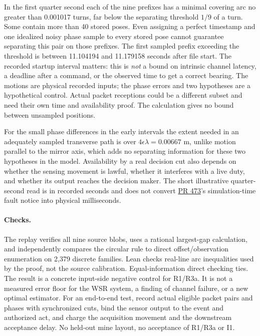 \documentclass[11pt]{article}
\begin{document}
In the first quarter second each of the nine prefixes has a minimal covering arc no greater than 0.001017 turns, far below the separating threshold $1/9$ of a turn. Some contain more than 40 stored poses. Even assigning a perfect timestamp and one idealized noisy phase sample to every stored pose cannot guarantee separating this pair on those prefixes. The first sampled prefix exceeding the threshold is between 11.104194 and 11.179158 seconds after file start. The recorded startup interval matters: this is \emph{not} a bound on intrinsic channel latency, a deadline after a command, or the observed time to get a correct bearing. The motions are physical recorded inputs; the phase errors and two hypotheses are a hypothetical control. Actual packet receptions could be a different subset and need their own time and availability proof. The calculation gives no bound between unsampled positions.

For the small phase differences in the early intervals the extent needed in an adequately sampled transverse path is over $4\epsilon\lambda=0.00667$ m, unlike motion parallel to the mirror axis, which adds no separating information for these two hypotheses in the model. Availability by a real decision cut also depends on whether the sensing movement is lawful, whether it interferes with a live duty, and whether its output reaches the decision maker. The short illustrative quarter-second read is in recorded seconds and does not convert \href{https://github.com/eternal-november/eos-research-programmes/pull/473}{PR 473}'s simulation-time fault notice into physical milliseconds.

\paragraph{Checks.}
The replay verifies all nine source blobs, uses a rational largest-gap calculation, and independently compares the circular rule to direct offset/observation enumeration on 2,379 discrete families. Lean checks real-line arc inequalities used by the proof, not the source calibration. Equal-information direct checking ties. The result is a concrete input-side negative control for R1/R3a. It is not a measured error floor for the WSR system, a finding of channel failure, or a new optimal estimator. For an end-to-end test, record actual eligible packet pairs and phases with synchronized cuts, bind the sensor output to the event and authorized act, and charge the acquisition movement and the downstream acceptance delay. No held-out mine layout, no acceptance of R1/R3a or I1.
\end{document}
